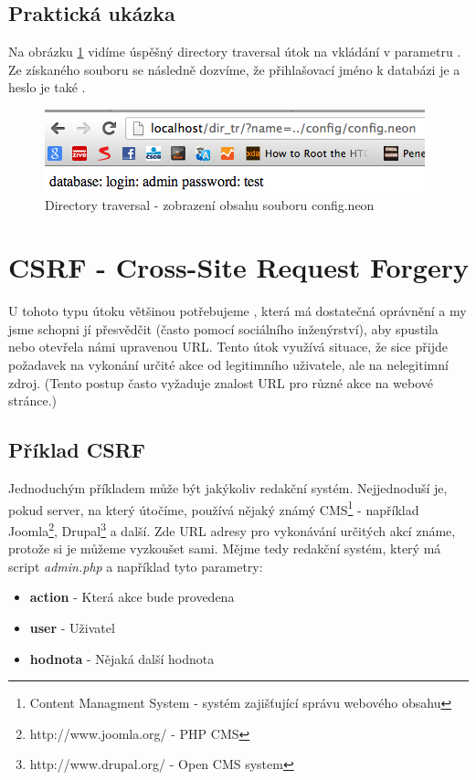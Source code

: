 \documentclass[12pt, a4paper]{report}
\begin{document}
\subsection{Praktická ukázka}
Na obrázku \ref{obr.directory} vidíme úspěšný directory traversal útok na vkládání v parametru . Ze získaného souboru  se následně dozvíme, že přihlašovací jméno k databázi je  a heslo je také .
\begin{figure}[h!]
\centerline{\includegraphics[width=416px]{./examples/dir_ex2.png}}
\caption{Directory traversal - zobrazení obsahu souboru config.neon}
\label{obr.directory}
\end{figure}

\section{CSRF - Cross-Site Request Forgery}
U tohoto typu útoku většinou potřebujeme , která má dostatečná oprávnění a my jsme schopni jí přesvědčit (často pomocí sociálního inženýrství), aby spustila nebo otevřela námi upravenou URL. Tento útok využívá situace, že sice přijde požadavek na vykonání určité akce od legitimního uživatele, ale na nelegitimní zdroj.\cite{cgisecurity} (Tento postup často vyžaduje znalost URL pro různé akce na webové stránce.)

\subsection{Příklad CSRF}
Jednoduchým příkladem může být jakýkoliv redakční systém. Nejjednoduší je, pokud server, na který útočíme, používá nějaký známý CMS\footnote{Content Managment System - systém zajišťující správu webového obsahu} - například Joomla\footnote{http://www.joomla.org/ - PHP CMS}, Drupal\footnote{http://www.drupal.org/ - Open CMS system} a další. Zde URL adresy pro vykonávání určitých akcí známe, protože si je můžeme vyzkoušet sami. Mějme tedy redakční systém, který má script \textit{admin.php} a například tyto parametry:
\begin{itemize}
\item \textbf{action} - Která akce bude provedena
\item \textbf{user} - Uživatel
\item \textbf{hodnota} - Nějaká další hodnota
\end{itemize}
\end{document}
